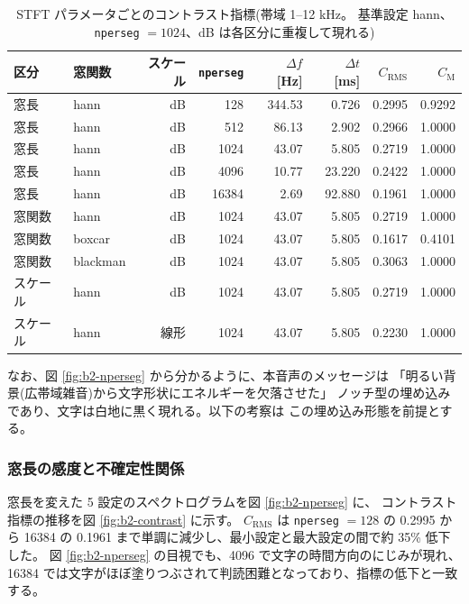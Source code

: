 \begin{table}[htbp]
\centering
\caption{STFT パラメータごとのコントラスト指標(帯域 1--12 kHz。
基準設定 hann、{\tt nperseg} $=1024$、dB は各区分に重複して現れる)}
\label{tab:b2-contrast}
\begin{tabular}{llrrrrrr}
\hline
区分 & 窓関数 & スケール & {\tt nperseg} & $\Delta f$ [Hz] & $\Delta t$ [ms] &
$C_{\mathrm{RMS}}$ & $C_{\mathrm{M}}$ \\
\hline
窓長 & hann & dB & 128 & 344.53 & 0.726 & 0.2995 & 0.9292 \\
窓長 & hann & dB & 512 & 86.13 & 2.902 & 0.2966 & 1.0000 \\
窓長 & hann & dB & 1024 & 43.07 & 5.805 & 0.2719 & 1.0000 \\
窓長 & hann & dB & 4096 & 10.77 & 23.220 & 0.2422 & 1.0000 \\
窓長 & hann & dB & 16384 & 2.69 & 92.880 & 0.1961 & 1.0000 \\
窓関数 & hann & dB & 1024 & 43.07 & 5.805 & 0.2719 & 1.0000 \\
窓関数 & boxcar & dB & 1024 & 43.07 & 5.805 & 0.1617 & 0.4101 \\
窓関数 & blackman & dB & 1024 & 43.07 & 5.805 & 0.3063 & 1.0000 \\
スケール & hann & dB & 1024 & 43.07 & 5.805 & 0.2719 & 1.0000 \\
スケール & hann & 線形 & 1024 & 43.07 & 5.805 & 0.2230 & 1.0000 \\
\hline
\end{tabular}
\end{table}

なお、図 \ref{fig:b2-nperseg} から分かるように、本音声のメッセージは
「明るい背景(広帯域雑音)から文字形状にエネルギーを欠落させた」
ノッチ型の埋め込みであり、文字は白地に黒く現れる。以下の考察は
この埋め込み形態を前提とする。

\subsubsection{窓長の感度と不確定性関係}

窓長を変えた 5 設定のスペクトログラムを図 \ref{fig:b2-nperseg} に、
コントラスト指標の推移を図 \ref{fig:b2-contrast} に示す。
$C_{\mathrm{RMS}}$ は {\tt nperseg} $= 128$ の 0.2995 から
16384 の 0.1961 まで単調に減少し、最小設定と最大設定の間で約 35\% 低下した。
図 \ref{fig:b2-nperseg} の目視でも、4096 で文字の時間方向のにじみが現れ、
16384 では文字がほぼ塗りつぶされて判読困難となっており、指標の低下と一致する。

